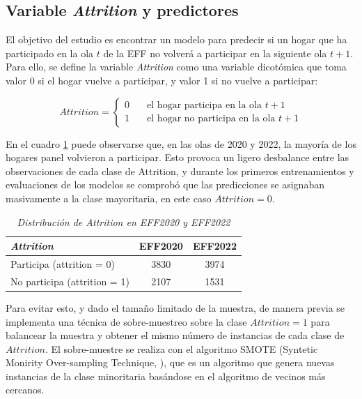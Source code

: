 \subsection*{Variable \textit{Attrition} y predictores}

El objetivo del estudio es encontrar un modelo para predecir si un hogar que ha participado en la ola $t$ de la EFF no volverá a participar en la siguiente ola $t+1$. Para ello, se define la variable \textit{Attrition} como una variable dicotómica que toma valor 0 si el hogar vuelve a participar, y valor 1 si no vuelve a participar:

\begin{equation}
Attrition =
  \begin{cases}
    0       & \quad \text{el hogar participa en la ola $t+1$} \\
    1  & \quad \text{el hogar no participa en la ola $t+1$}
  \end{cases}
\end{equation}

En el cuadro \ref{table:attrition} puede observarse que, en las olas de 2020 y 2022, la mayoría de los hogares panel volvieron a participar. Esto provoca un ligero desbalance entre las observaciones de cada clase de Attrition, y durante los primeros entrenamientos y evaluaciones de los modelos se comprobó que las predicciones se asignaban masivamente a la clase mayoritaria, en este caso $Attrition=0$.

\begin{table}[htbp]
\centering{}
\begin{tabular}{lcc}
\textbf{\textit{Attrition}}           & \textbf{EFF2020} & \textbf{EFF2022} \\ \hline
Participa (attrition = 0)    & 3830             & 3974             \\
No participa (attrition = 1) & 2107             & 1531             \\ \hline
\end{tabular}
\caption{\textit{Distribución de Attrition en EFF2020 y EFF2022}}
\label{table:attrition}
\end{table}

Para evitar esto, y dado el tamaño limitado de la muestra, de manera previa se implementa una técnica de sobre-muestreo sobre la clase $Attrition=1$ para balancear la muestra y obtener el mismo número de instancias de cada clase de $Attrition$. El sobre-muestre se realiza con el algoritmo SMOTE (Syntetic Monirity Over-sampling Technique, \cite{chawla2002smote}), que es un algoritmo que genera nuevas instancias de la clase minoritaria basándose en el algoritmo de vecinos más cercanos.

